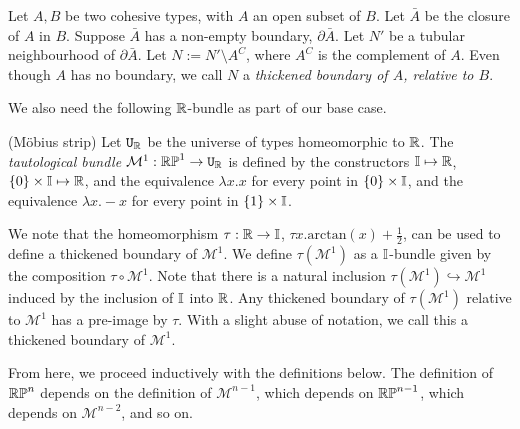 \documentclass{amsart}
\begin{document}
\begin{definition}
Let $A, B$ be two cohesive types, with $A$ an open subset of $B$. Let $\bar{A}$ be the closure of $A$ in $B$. Suppose $\bar{A}$ has a non-empty boundary, $\partial \bar{A}$. Let $N'$ be a tubular neighbourhood of $\partial\bar{A}$. Let $N := N' \setminus A^C$, where $A^C$ is the complement of $A$. Even though $A$ has no boundary, we call $N$ a \emph{thickened boundary of $A$, relative to $B$}.
\end{definition}

We also need the following $\mathbb{R}$-bundle as part of our base case. 
\begin{definition}(M\"{o}bius strip)
Let $\mathtt{U}_{\mathbb{R}}$ be the universe of types homeomorphic to $\mathbb{R}$. The \emph{tautological bundle} $\mathcal{M}^1: \mathbb{RP}^1 \rightarrow \mathtt{U}_{\mathbb{R}}$ is defined by the constructors $\mathbb{I} \mapsto \mathbb{R}$, $\{0 \} \times \mathbb{I} \mapsto \mathbb{R}$, and the equivalence $\lambda x. x$ for every point in $\{0\} \times \mathbb{I}$, and the equivalence $\lambda x. -x$ for every point in $\{1\} \times \mathbb{I}$.
\end{definition}

We note that the homeomorphism $\tau: \mathbb{R} \rightarrow \mathbb{I}$, $\tau x. \text{arctan}(x)+ \frac{1}{2}$, can be used to define a thickened boundary of $\mathcal{M}^1$. We define $\tau(\mathcal{M}^1)$ as a $\mathbb{I}$-bundle given by the composition $\tau \circ \mathcal{M}^1$.  Note that there is a natural inclusion $\tau(\mathcal{M}^1) \hookrightarrow \mathcal{M}^1$ induced by the inclusion of $\mathbb{I}$ into $\mathbb{R}$. Any thickened boundary of $\tau(\mathcal{M}^1)$ relative to $\mathcal{M}^1$ has a pre-image by $\tau$. With a slight abuse of notation, we call this a thickened boundary of $\mathcal{M}^1$. 

From here, we proceed inductively with the definitions below. The definition of $\mathbb{RP}^n$ depends on the definition of $\mathcal{M}^{n-1}$, which depends on $\mathbb{RP}^{n-1}$, which depends on $\mathcal{M}^{n-2}$, and so on.
\end{document}
